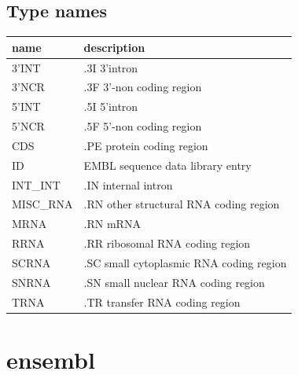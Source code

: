 \documentclass{article}
\begin{document}
\begin{Schunk}
\subsection{Type names}
\noindent\begin{tabular}{ll}
\hline \hline
name & description\\
\hline
3'INT & .3I 3'intron \\
3'NCR & .3F  3'-non coding region \\
5'INT & .5I 5'intron \\
5'NCR & .5F  5'-non coding region \\
CDS & .PE protein coding region \\
ID & EMBL sequence data library entry \\
INT\_INT & .IN  internal intron \\
MISC\_RNA & .RN other structural RNA coding region \\
MRNA & .RN mRNA \\
RRNA & .RR ribosomal RNA coding region \\
SCRNA & .SC small cytoplasmic RNA coding region \\
SNRNA & .SN small nuclear RNA coding region \\
TRNA & .TR transfer RNA coding region \\
\hline \hline
\end{tabular}

\section{ ensembl }

\end{Schunk}
\end{document}
